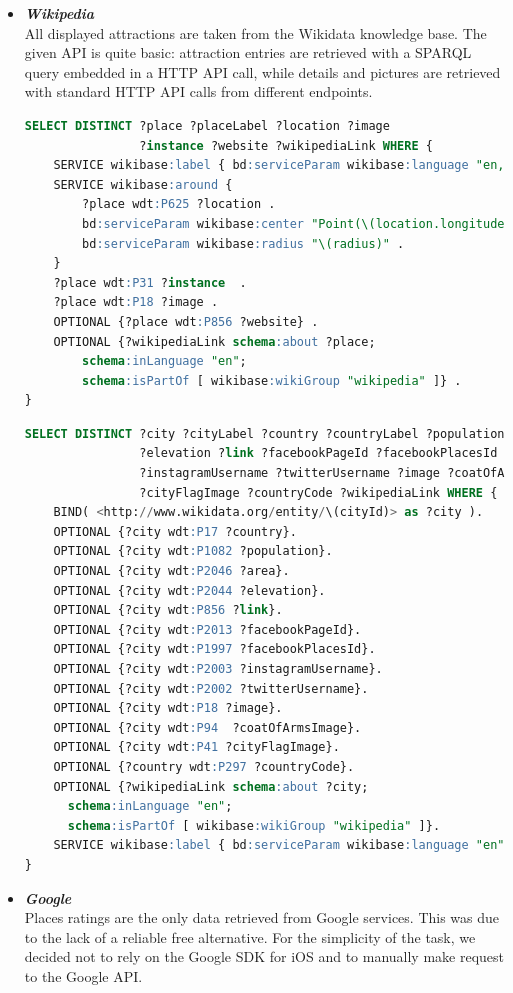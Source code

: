 \documentclass[a4paper, 11pt, parskip=half]{scrreprt}
\theoremstyle{definition}
\begin{document}
\begin{itemize}
	\item \textit{\textbf{Wikipedia}} \\
	All displayed attractions are taken from the Wikidata knowledge base. The given API is quite basic: attraction entries are retrieved with a SPARQL query embedded in a HTTP API call, while details and pictures are retrieved with standard HTTP API calls from different endpoints.
		
	\begin{lstlisting}[language=sql, caption={SPARQL query for attraction retrieving}, captionpos=b]
SELECT DISTINCT ?place ?placeLabel ?location ?image 
                ?instance ?website ?wikipediaLink WHERE {
    SERVICE wikibase:label { bd:serviceParam wikibase:language "en, it" }
    SERVICE wikibase:around {
        ?place wdt:P625 ?location .
        bd:serviceParam wikibase:center "Point(\(location.longitude) \(location.latitude))"^^geo:wktLiteral .
        bd:serviceParam wikibase:radius "\(radius)" .
    }
    ?place wdt:P31 ?instance  .
    ?place wdt:P18 ?image .
    OPTIONAL {?place wdt:P856 ?website} .
    OPTIONAL {?wikipediaLink schema:about ?place;
        schema:inLanguage "en";
        schema:isPartOf [ wikibase:wikiGroup "wikipedia" ]} .
}
	\end{lstlisting}
		
	\begin{lstlisting}[language=sql, caption={SPARQL query for city detail retrieving}, captionpos=b]
SELECT DISTINCT ?city ?cityLabel ?country ?countryLabel ?population ?area
                ?elevation ?link ?facebookPageId ?facebookPlacesId
                ?instagramUsername ?twitterUsername ?image ?coatOfArmsImage
                ?cityFlagImage ?countryCode ?wikipediaLink WHERE {
    BIND( <http://www.wikidata.org/entity/\(cityId)> as ?city ).
    OPTIONAL {?city wdt:P17 ?country}.
    OPTIONAL {?city wdt:P1082 ?population}.
    OPTIONAL {?city wdt:P2046 ?area}.
    OPTIONAL {?city wdt:P2044 ?elevation}.
    OPTIONAL {?city wdt:P856 ?link}.
    OPTIONAL {?city wdt:P2013 ?facebookPageId}.
    OPTIONAL {?city wdt:P1997 ?facebookPlacesId}.
    OPTIONAL {?city wdt:P2003 ?instagramUsername}.
    OPTIONAL {?city wdt:P2002 ?twitterUsername}.
    OPTIONAL {?city wdt:P18 ?image}.
    OPTIONAL {?city wdt:P94  ?coatOfArmsImage}.
    OPTIONAL {?city wdt:P41 ?cityFlagImage}.
    OPTIONAL {?country wdt:P297 ?countryCode}.
    OPTIONAL {?wikipediaLink schema:about ?city;
      schema:inLanguage "en";
      schema:isPartOf [ wikibase:wikiGroup "wikipedia" ]}.
    SERVICE wikibase:label { bd:serviceParam wikibase:language "en". }
}
	\end{lstlisting}
		
	\item \textit{\textbf{Google}} \\
	Places ratings are the only data retrieved from Google services. This was due to the lack of a reliable free alternative. For the simplicity of the task, we decided not to rely on the Google SDK for iOS and to manually make request to the Google API.
\end{itemize}
\end{document}
